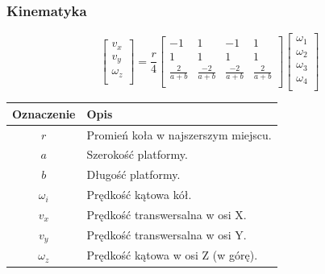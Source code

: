 \documentclass{beamer}
\begin{document}
	\begin{frame}
		\frametitle{Kinematyka}
		\[
		\begin{bmatrix}
		v_x \\
		v_y \\
		\omega_z \\
		\end{bmatrix}
		=
		\frac{r}{4}
		\begin{bmatrix}
		-1 & 1 & -1 & 1 \\
		1 & 1 & 1 & 1 \\
		\frac{2}{a+b} & \frac{-2}{a+b} & \frac{-2}{a+b} & \frac{2}{a+b} \\
		\end{bmatrix}
		\begin{bmatrix}
		\omega_1 \\
		\omega_2 \\
		\omega_3 \\
		\omega_4 \\
		\end{bmatrix}
		\]
		\begin{table}
		\centering
		\begin{tabular}{c l}
		Oznaczenie & Opis \\
		\hline
		$r$ &  Promień koła w najszerszym miejscu. \\
		$a$ &  Szerokość platformy. \\
		$b$ &  Długość platformy. \\
		$\omega_i$ &  Prędkość kątowa kół. \\
		$v_x$ &  Prędkość transwersalna w osi X. \\
		$v_y$ &  Prędkość transwersalna w osi Y. \\
		$\omega_z$ &  Prędkość kątowa w osi Z (w górę). \\
		\end{tabular}
		\end{table}
	\end{frame}
	
\end{document}
